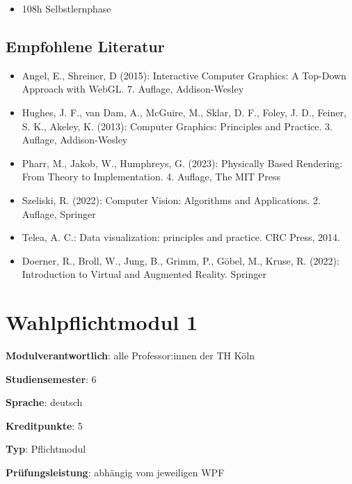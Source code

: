 \begin{itemize}
\tightlist
\item
  108h Selbstlernphase
\end{itemize}

\hypertarget{empfohlene-literaturpathlabel....srcmodulbeschreibungen-bachelor-bpo5ba_visual-computing}{%
\section*{Empfohlene
Literatur\label{../../src/modulbeschreibungen-bachelor-bpo5/BA_Visual-Computing}}\label{empfohlene-literaturpathlabel....srcmodulbeschreibungen-bachelor-bpo5ba_visual-computing}}

\begin{itemize}
\tightlist
\item
  Angel, E., Shreiner, D (2015): Interactive Computer Graphics: A
  Top-Down Approach with WebGL. 7. Auflage, Addison-Wesley
\item
  Hughes, J. F., van Dam, A., McGuire, M., Sklar, D. F., Foley, J. D.,
  Feiner, S. K., Akeley, K. (2013): Computer Graphics: Principles and
  Practice. 3. Auflage, Addison-Wesley
\item
  Pharr, M., Jakob, W., Humphreys, G. (2023): Physically Based
  Rendering: From Theory to Implementation. 4. Auflage, The MIT Press
\item
  Szeliski, R. (2022): Computer Vision: Algorithms and Applications. 2.
  Auflage, Springer
\item
  Telea, A. C.: Data visualization: principles and practice. CRC Press,
  2014.
\item
  Doerner, R., Broll, W., Jung, B., Grimm, P., Göbel, M., Kruse, R.
  (2022): Introduction to Virtual and Augmented Reality. Springer
\end{itemize}

\hypertarget{wahlpflichtmodul-1pathlabel....srcmodulbeschreibungen-bachelor-bpo5ba_wpf-1}{%
\chapter{Wahlpflichtmodul
1\label{../../src/modulbeschreibungen-bachelor-bpo5/BA_WPF-1}}\label{wahlpflichtmodul-1pathlabel....srcmodulbeschreibungen-bachelor-bpo5ba_wpf-1}}

\begin{modulHead}
\textbf{Modulverantwortlich}: alle Professor:innen
der TH Köln
\end{modulHead}
\begin{modulHead}
\textbf{Studiensemester}:
6
\end{modulHead}
\begin{modulHead}
\textbf{Sprache}:
deutsch
\end{modulHead}
\begin{modulHead}
\textbf{Kreditpunkte}:
5
\end{modulHead}
\begin{modulHead}
\textbf{Typ}:
Pflichtmodul
\end{modulHead}
\begin{modulHead}
\textbf{Prüfungsleistung}:
abhängig vom jeweiligen WPF
\end{modulHead}


